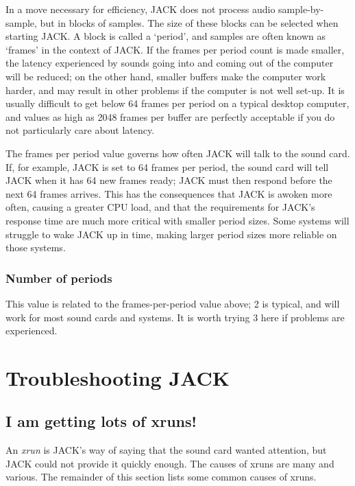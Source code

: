 \documentclass[10pt,a4paper]{book}
\begin{document}
In a move necessary for efficiency, JACK does not process audio
sample-by-sample, but in blocks of samples.  The size of these blocks
can be selected when starting JACK\@.  A block is called a `period',
and samples are often known as `frames' in the context of JACK\@.  If
the frames per period count is made smaller, the latency experienced
by sounds going into and coming out of the computer will be reduced;
on the other hand, smaller buffers make the computer work harder, and
may result in other problems if the computer is not well set-up.  It
is usually difficult to get below 64 frames per period on a typical
desktop computer, and values as high as 2048 frames per buffer are
perfectly acceptable if you do not particularly care about latency.

\begin{danger}
The frames per period value governs how often JACK will talk to the
sound card.  If, for example, JACK is set to 64 frames per period, the
sound card will tell JACK when it has 64 new frames ready; JACK must
then respond before the next 64 frames arrives.  This has the
consequences that JACK is awoken more often, causing a greater CPU
load, and that the requirements for JACK's response time are much more
critical with smaller period sizes.  Some systems will struggle to wake
JACK up in time, making larger period sizes more reliable on those systems.
\end{danger}

\subsubsection{Number of periods}

This value is related to the frames-per-period value above; 2 is
typical, and will work for most sound cards and systems.  It is worth
trying 3 here if problems are experienced.


\section{Troubleshooting JACK}

\subsection{I am getting lots of xruns!}

An \emph{xrun} is JACK's way of saying that the sound card wanted
attention, but JACK could not provide it quickly enough.  The causes
of xruns are many and various.  The remainder of this section lists
some common causes of xruns.
\end{document}
